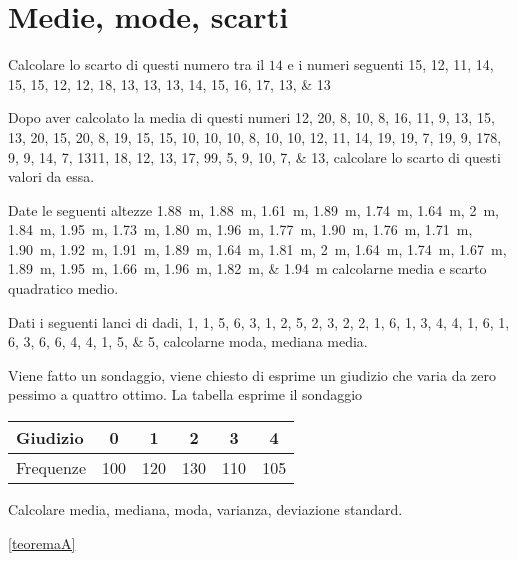 \section{Medie, mode, scarti}
\begin{esercizio}
	Calcolare lo scarto di questi numero tra il $14$ e i numeri seguenti \numlist{15; 12; 11; 14; 15; 15; 12; 12; 18; 13; 13; 13; 14; 15; 16; 17; 13; 13}
\end{esercizio}
\begin{esercizio}
	Dopo aver calcolato la media di questi numeri \numlist{12; 20; 8; 10; 8; 16; 11; 9; 13; 15; 13; 20; 15; 20; 8; 19; 15; 15; 10; 10; 10; 8;
		10; 10; 12; 11; 14; 19; 19; 7; 19; 9; 17 8; 9; 9; 14; 7; 13 11; 18; 12; 13; 17; 9 9; 5;
		9; 10; 7; 13}, calcolare lo scarto di questi valori da essa.
\end{esercizio}
\begin{esercizio}
	 Date le seguenti altezze \SIlist{1.88; 1.88; 1.61; 1.89; 1.74; 1.64; 2; 1.84; 1.95; 1.73; 1.80; 1.96; 1.77; 1.90; 1.76; 1.71; 1.90;
		1.92; 1.91; 1.89; 1.64; 1.81; 2; 1.64; 1.74; 1.67; 1.89; 1.95; 1.66; 1.96; 1.82; 1.94}{\m} calcolarne media e scarto quadratico medio.
\end{esercizio}
\begin{esercizio}
Dati i seguenti lanci di dadi, \numlist{1; 1; 5; 6; 3; 1; 2; 5; 2; 3; 2; 2; 1; 6; 1; 3; 4; 4; 1; 6; 1; 6; 3; 6; 6; 4; 4; 1; 5; 5}, calcolarne moda, mediana media.
\end{esercizio}
\begin{esercizio}
	
	\item Viene fatto un sondaggio, viene chiesto di esprime un giudizio che varia da zero pessimo a quattro  ottimo. La tabella esprime il sondaggio
	\begin{center}
		\begin{tabular}{l*{5} {S[table-format=3.0]}}
			{Giudizio}	&0  &1  &2  &3&4  \\
			\midrule 
			{Frequenze}	& 100 &120  & 130 & 110&105 \\ 
		\end{tabular}
	\end{center} Calcolare media, mediana, moda, varianza, deviazione standard.
\end{esercizio}

\vref{teoremaA}

